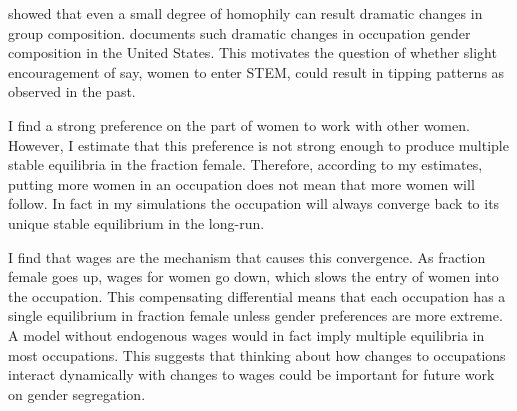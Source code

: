 \documentclass[11pt]{article}
\begin{document}





 showed that even a small degree of homophily can result dramatic changes in group composition.  documents such dramatic changes in occupation gender composition in the United States. This motivates the question of whether slight encouragement of say, women to enter STEM, could result in tipping patterns as observed in the past. 

I find a strong preference on the part of women to work with other women. However, I estimate that this preference is not strong enough to produce multiple stable equilibria in the fraction female. Therefore, according to my estimates, putting more women in an occupation does not mean that more women will follow. In fact in my simulations the occupation will always converge back to its unique stable equilibrium in the long-run.


I find that wages are the mechanism that causes this convergence. As fraction female goes up, wages for women go down, which slows the entry of women into the occupation. This compensating differential means that each occupation has a single equilibrium in fraction female unless gender preferences are more extreme. A model without endogenous wages would in fact imply multiple equilibria in most occupations. This suggests that thinking about how changes to occupations interact dynamically with changes to wages could be important for future work on gender segregation.

\end{document}
